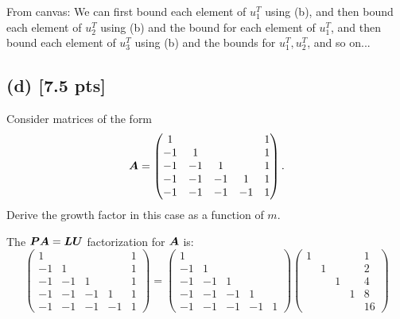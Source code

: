 \documentclass[twoside,10pt]{article}
\begin{document}
From canvas: We can first bound each element of $u_1^T$ using (b), and then bound each element of $u_2^T$ using (b) and the bound for each element of $u_1^T$, and then bound each element of $u_3^T$ using (b) and the bounds for $u_1^T, u_2^T$, and so on...

\subsection*{(d) [7.5 pts]} Consider matrices of the form 
\begin{equation}
  \bm{A} = 
  \begin{pmatrix}
    1  &    &   &       & 1 \\
    -1 & 1  &   &       & 1 \\
    -1 & -1 & 1 &       & 1 \\
    -1 & -1 & -1 &    1 & 1 \\
    -1 & -1 & -1 &  - 1 & 1 
  \end{pmatrix}.
\end{equation}
Derive the growth factor in this case as a function of $m$.

The $\bm{P}\bm{A} = \bm{L}\bm{U}$ factorization for $\bm{A}$ is:
\begin{equation}
  \begin{pmatrix}
    1  &    &   &       & 1 \\
    -1 & 1  &   &       & 1 \\
    -1 & -1 & 1 &       & 1 \\
    -1 & -1 & -1 &    1 & 1 \\
    -1 & -1 & -1 &  - 1 & 1 
  \end{pmatrix}
  =
  \begin{pmatrix}
    1  &    &   &        \\
    -1 & 1  &   &        \\
    -1 & -1 & 1 &        \\
    -1 & -1 & -1 &    1  \\
    -1 & -1 & -1 &  - 1 & 1 
  \end{pmatrix}
  \begin{pmatrix}
    1  &   &   &   & 1 \\
       & 1 &   &   & 2 \\
       &   & 1 &   & 4 \\
       &   &   & 1 & 8 \\
       &   &   &   & 16 
  \end{pmatrix}
\end{equation}
\end{document}
